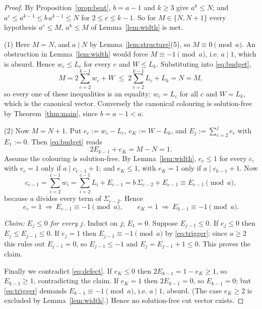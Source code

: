 \documentclass{amsart}
\theoremstyle{definition}
\begin{document}
\begin{proof}
By Proposition~\ref{prop:beat}, $b=a-1$ and $k\ge3$ give $a^{k}\le N$; and
$a^{c}\le a^{k-1}\le b\,a^{k-1}\le N$ for $2\le c\le k-1$.  So for
$M\in\{N,N+1\}$ every hypothesis $a^{c}\le M$, $a^{k}\le M$ of
Lemma~\ref{lem:width} is met.

(1) Here $M=N$, and $a\mid N$ by Lemma~\ref{lem:structure}(5), so
$M\equiv0\pmod a$.  An obstruction in Lemma~\ref{lem:width} would force
$M\equiv-1\pmod a$, i.e. $a\mid1$, which is absurd.  Hence $w_c\le L_c$ for
every $c$ and $W\le L_k$.  Substituting into \eqref{eq:budget},
\[
  M=2\sum_{c=2}^{k-1}w_c+W\;\le\;2\sum_{c=2}^{k-1}L_c+L_k=N=M ,
\]
so every one of these inequalities is an equality: $w_c=L_c$ for all $c$ and
$W=L_k$, which is the canonical vector.  Conversely the canonical colouring is
solution-free by Theorem~\ref{thm:main}, since $b=a-1<a$.

(2) Now $M=N+1$.  Put $e_c:=w_c-L_c$, $e_K:=W-L_k$, and
$E_j:=\sum_{c=2}^{j}e_c$ with $E_1:=0$.  Then \eqref{eq:budget} reads
\begin{equation}\label{eq:defect}
  2E_{k-1}+e_K=M-N=1 .
\end{equation}
Assume the colouring is solution-free.  By Lemma~\ref{lem:width}, $e_c\le1$ for
every $c$, with $e_c=1$ only if $a\mid c_{c-1}+1$; and $e_K\le1$, with $e_K=1$
only if $a\mid c_{k-1}+1$.  Now
\[
  c_{c-1}=\sum_{i=2}^{c-1}w_i=\sum_{i=2}^{c-1}L_i+E_{c-1}
         =b\,\Sigma_{c-2}+E_{c-1}\equiv E_{c-1}\pmod a ,
\]
because $a$ divides every term of $\Sigma_{c-2}$.  Hence
\begin{equation}\label{eq:trigger}
  e_c=1\ \Longrightarrow\ E_{c-1}\equiv-1\!\!\pmod a,
  \qquad
  e_K=1\ \Longrightarrow\ E_{k-1}\equiv-1\!\!\pmod a .
\end{equation}

\emph{Claim: $E_j\le0$ for every $j$.}  Induct on $j$; $E_1=0$.  Suppose
$E_{j-1}\le0$.  If $e_j\le0$ then $E_j\le E_{j-1}\le0$.  If $e_j=1$ then
$E_{j-1}\equiv-1\pmod a$ by \eqref{eq:trigger}; since $a\ge2$ this rules out
$E_{j-1}=0$, so $E_{j-1}\le-1$ and $E_j=E_{j-1}+1\le0$.  This proves the claim.

Finally we contradict \eqref{eq:defect}.  If $e_K\le0$ then
$2E_{k-1}=1-e_K\ge1$, so $E_{k-1}\ge1$, contradicting the claim.  If $e_K=1$
then $2E_{k-1}=0$, so $E_{k-1}=0$; but \eqref{eq:trigger} demands
$E_{k-1}\equiv-1\pmod a$, i.e. $a\mid1$, absurd.  (The case $e_K\ge2$ is
excluded by Lemma~\ref{lem:width}.)  Hence no solution-free cut vector exists.
\end{proof}
\end{document}
